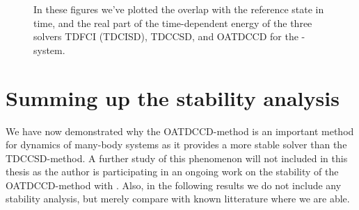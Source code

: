 \begin{figure}
            \caption{In these figures we've plotted the overlap with the
            reference state in time, and the real part of the time-dependent
            energy of the three solvers TDFCI (TDCISD), TDCCSD, and OATDCCD for
            the -system.}
            \label{fig:be-stability}
        \end{figure}


    \section{Summing up the stability analysis}
        We have now demonstrated why the OATDCCD-method is an important method
        for dynamics of many-body systems as it provides a more stable solver
        than the TDCCSD-method.
        A further study of this phenomenon will not included in this thesis as
        the author is participating in an ongoing work on the stability of the
        OATDCCD-method with \citeauthor{oa-stability} \cite{oa-stability}.
        Also, in the following results we do not include any stability analysis,
        but merely compare with known litterature where we are able.
